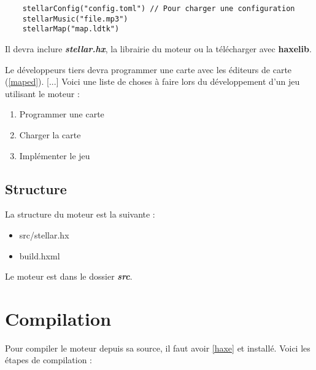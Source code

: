 \documentclass{article}
\numberwithin{equation}{section}    %
\begin{document}
    \begin{lstlisting}
    stellarConfig("config.toml") // Pour charger une configuration
    stellarMusic("file.mp3")
    stellarMap("map.ldtk")
    \end{lstlisting}

    

    Il devra inclure \textbf{\textit{stellar.hx}}, la librairie du moteur ou la télécharger avec \textbf{haxelib}.\vspace{0.5cm}

    Le développeurs tiers devra programmer une carte avec les éditeurs de carte (\ref{maped}). [...] Voici une liste de choses à faire lors du développement d'un jeu utilisant le moteur : \vspace{0.5cm}

    \begin{enumerate}
        \item Programmer une carte
        \item Charger la carte
        \item Implémenter le jeu
    \end{enumerate}

\subsection{Structure}
    La structure du moteur est la suivante : \vspace{0.5cm}

    \begin{itemize}
        \item src/stellar.hx
        \item build.hxml
    \end{itemize} \vspace{0.5cm}
    
    Le moteur est dans le dossier \textbf{\textit{src}}.

\section{Compilation}
    Pour compiler le moteur depuis sa source, il faut avoir \ref{haxe} et  installé. Voici les étapes de compilation : \vspace{0.5cm}

    
    \vspace{0.5cm}
\end{document}
